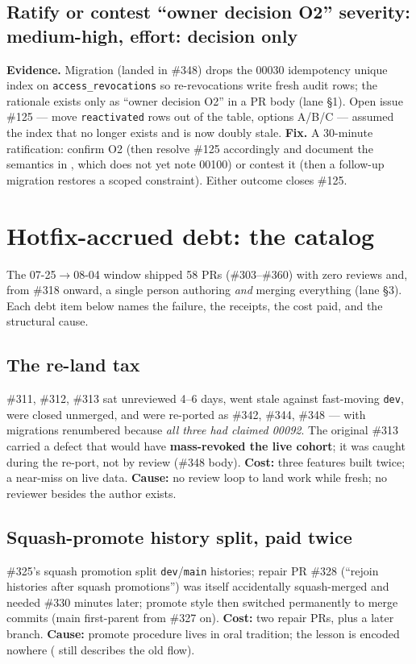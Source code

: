 \documentclass[10pt]{article}
\newcommand{\gh}[1]{\mbox{\##1}}
\newcommand{\sev}[1]{\textbf{#1}}
\begin{document}
\subsection{Ratify or contest ``owner decision O2'' \hfill \sev{severity: medium-high, effort: decision only}}
\textbf{Evidence.} Migration  (landed in \gh{348}) drops the 00030 idempotency unique index on \texttt{access\_revocations} so re-revocations write fresh audit rows; the rationale exists only as ``owner decision O2'' in a PR body (lane  \S1). Open issue \gh{125} --- move \texttt{reactivated} rows out of the table, options A/B/C --- assumed the index that no longer exists and is now doubly stale.
\textbf{Fix.} A 30-minute ratification: confirm O2 (then resolve \gh{125} accordingly and document the semantics in , which does not yet note 00100) or contest it (then a follow-up migration restores a scoped constraint). Either outcome closes \gh{125}.

\section{Hotfix-accrued debt: the catalog}
The 07-25$\rightarrow$08-04 window shipped 58 PRs (\gh{303}--\gh{360}) with zero reviews and, from \gh{318} onward, a single person authoring \emph{and} merging everything (lane  \S3). Each debt item below names the failure, the receipts, the cost paid, and the structural cause.

\subsection{The re-land tax}
\gh{311}, \gh{312}, \gh{313} sat unreviewed 4--6 days, went stale against fast-moving \texttt{dev}, were closed unmerged, and were re-ported as \gh{342}, \gh{344}, \gh{348} --- with migrations renumbered because \emph{all three had claimed 00092}. The original \gh{313} carried a defect that would have \textbf{mass-revoked the live cohort}; it was caught during the re-port, not by review (\gh{348} body). \textbf{Cost:} three features built twice; a near-miss on live data. \textbf{Cause:} no review loop to land work while fresh; no reviewer besides the author exists.

\subsection{Squash-promote history split, paid twice}
\gh{325}'s squash promotion split \texttt{dev}/\texttt{main} histories; repair PR \gh{328} (``rejoin histories after squash promotions'') was itself accidentally squash-merged and needed \gh{330} minutes later; promote style then switched permanently to merge commits (main first-parent from \gh{327} on). \textbf{Cost:} two repair PRs, plus a later  branch. \textbf{Cause:} promote procedure lives in oral tradition; the lesson is encoded nowhere ( still describes the old flow).
\end{document}
